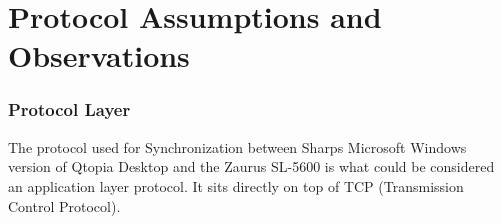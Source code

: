 %
%

%
%

\newcommand{\synctypes}{
  \begin{enumerate}
  \item To-Do 0x06.
  \item Calendar 0x01.
  \item Address Book 0x07.
  \end{enumerate}
}

\part{Protocol Assumptions and Observations}

    \section{Protocol Layer}

    The protocol used for Synchronization between Sharps Microsoft Windows
    version of Qtopia Desktop and the Zaurus SL-5600 is what could be
    considered an application layer protocol. It sits directly on top of
    TCP (Transmission Control Protocol).

